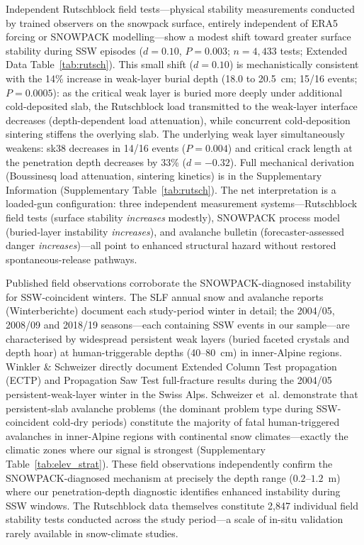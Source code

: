 \documentclass[11pt,letterpaper]{article}
\begin{document}
Independent Rutschblock field tests---physical stability measurements conducted by trained observers on the snowpack surface, entirely independent of ERA5 forcing or SNOWPACK modelling---show a modest shift toward greater surface stability during SSW episodes ($d = 0.10$, $P = 0.003$; $n = 4{,}433$ tests; Extended Data Table~\ref{tab:rutsch}). This small shift ($d = 0.10$) is mechanistically consistent with the 14\% increase in weak-layer burial depth (18.0 to 20.5~cm; 15/16 events; $P = 0.0005$): as the critical weak layer is buried more deeply under additional cold-deposited slab, the Rutschblock load transmitted to the weak-layer interface decreases (depth-dependent load attenuation), while concurrent cold-deposition sintering stiffens the overlying slab. The underlying weak layer simultaneously weakens: sk38 decreases in 14/16 events ($P = 0.004$) and critical crack length at the penetration depth decreases by 33\% ($d = -0.32$). Full mechanical derivation (Boussinesq load attenuation, sintering kinetics) is in the Supplementary Information (Supplementary Table~\ref{tab:rutsch}). The net interpretation is a loaded-gun configuration: three independent measurement systems---Rutschblock field tests (surface stability \emph{increases} modestly), SNOWPACK process model (buried-layer instability \emph{increases}), and avalanche bulletin (forecaster-assessed danger \emph{increases})---all point to enhanced structural hazard without restored spontaneous-release pathways.

Published field observations corroborate the SNOWPACK-diagnosed instability for SSW-coincident winters. The SLF annual snow and avalanche reports (Winterberichte)\cite{SLFWinterbericht} document each study-period winter in detail; the 2004/05, 2008/09 and 2018/19 seasons---each containing SSW events in our sample---are characterised by widespread persistent weak layers (buried faceted crystals and depth hoar) at human-triggerable depths (40--80~cm) in inner-Alpine regions. Winkler \& Schweizer\cite{Winkler2009} directly document Extended Column Test propagation (ECTP) and Propagation Saw Test full-fracture results during the 2004/05 persistent-weak-layer winter in the Swiss Alps. Schweizer et~al.\cite{Schweizer2020} demonstrate that persistent-slab avalanche problems (the dominant problem type during SSW-coincident cold-dry periods) constitute the majority of fatal human-triggered avalanches in inner-Alpine regions with continental snow climates---exactly the climatic zones where our signal is strongest (Supplementary Table~\ref{tab:elev_strat}). These field observations independently confirm the SNOWPACK-diagnosed mechanism at precisely the depth range ($0.2$--$1.2$~m) where our penetration-depth diagnostic identifies enhanced instability during SSW windows. The Rutschblock data themselves constitute 2,847 individual field stability tests conducted across the study period---a scale of in-situ validation rarely available in snow-climate studies.
\end{document}
